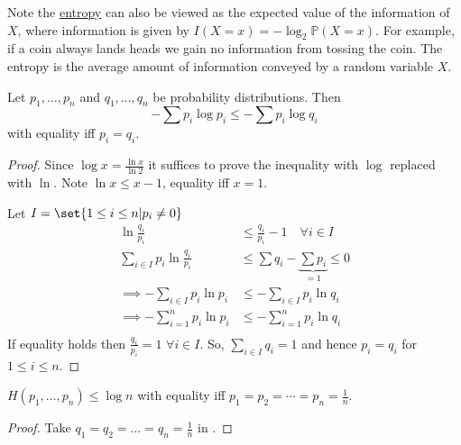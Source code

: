 \documentclass{article}
\newcommand{\Prob}{\mathbb{P}}
\newcommand{\1}[1]{\mathbbm{1}_{#1}}
\begin{document}
Note the \hyperlink{def:entropy}{entropy} can also be viewed as the expected value of the information of $X$, where information is given by $I(X=x) = -\log_2 \Prob(X=x)$.
For example, if a coin always lands heads we gain no information from tossing the coin.
The entropy is the average amount of information conveyed by a random variable $X$.

\begin{nlemma}\label{lem:gibbs}
    Let $p_1, \dotsc, p_n$ and $q_1, \dotsc, q_n$ be probability distributions. Then
    \begin{equation*}
        -\sum p_i \log p_i \leq -\sum p_i \log q_i
    \end{equation*}
    with equality iff $p_i = q_i$.
\end{nlemma}
\begin{proof}
    Since $\log x = \frac{\ln x}{\ln 2}$ it suffices to prove the inequality with $\log$ replaced with $\ln$.
    Note $\ln x \leq x - 1$, equality iff $x=1$.
    \begin{center}
    \end{center}
    Let $I = \set{1 \leq i \leq n | p_i \neq 0}$
    \begin{align*}
        \ln \frac{q_i}{p_i} &\leq \frac{q_i}{p_i} - 1 \quad \forall i \in I \\
        \sum_{i \in I} p_i \ln \frac{q_i}{p_i} &\leq \sum q_i - \underbrace{\sum p_i}_{=1} \leq 0 \\
        \implies -\sum_{i \in I} p_i \ln p_i &\leq -\sum_{i \in I} p_i \ln q_i \\
        \implies -\sum_{i =1}^n p_i \ln p_i &\leq -\sum_{i =1}^n p_i \ln q_i \\
    \end{align*}
    If equality holds then $\frac{q_i}{p_i} = 1$ $\forall i \in I$. So, $\sum_{i \in I} q_i = 1$ and hence $p_i = q_i$ for $1 \leq i \leq n$.
\end{proof}

\begin{cor}
    $H(p_1, \dotsc, p_n) \leq \log n$ with equality iff $p_1 = p_2 = \dotsb = p_n = \frac{1}{n}$.
\end{cor}
\begin{proof}
    Take $q_1 = q_2 = \dotsc = q_n = \frac{1}{n}$ in .
\end{proof}
\end{document}
